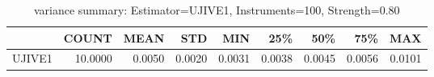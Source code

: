\begin{table}[ht]
\centering
\caption{variance summary: Estimator=UJIVE1, Instruments=100, Strength=0.80}
\begin{tabular}{lrrrrrrrr}
\toprule
 & COUNT & MEAN & STD & MIN & 25\% & 50\% & 75\% & MAX \\
\midrule
UJIVE1 & 10.0000 & 0.0050 & 0.0020 & 0.0031 & 0.0038 & 0.0045 & 0.0056 & 0.0101 \\
\bottomrule
\end{tabular}
\end{table}

